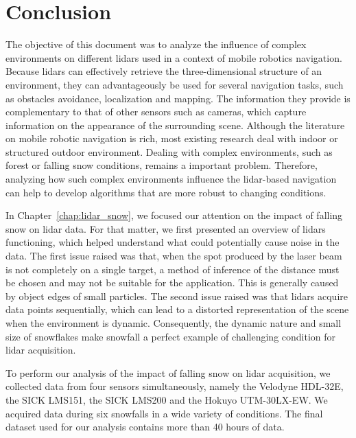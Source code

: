 \chapter*{Conclusion}

The objective of this document was to analyze the influence of complex environments on different \gls*{lidar}s used in a context of mobile robotics navigation. Because \gls*{lidar}s can effectively retrieve the three-dimensional structure of an environment, they can advantageously be used for several navigation tasks, such as obstacles avoidance, localization and mapping. The information they provide is complementary to that of other sensors such as cameras, which capture information on the appearance of the surrounding scene. Although the literature on mobile robotic navigation is rich, most existing research deal with indoor or structured outdoor environment. Dealing with complex environments, such as forest or falling snow conditions, remains a important problem. Therefore, analyzing how such complex environments influence the \gls*{lidar}-based navigation can help to develop algorithms that are more robust to changing conditions.

In Chapter~\ref{chap:lidar_snow}, we focused our attention on the impact of falling snow on \gls*{lidar} data. For that matter, we first presented an overview of \gls*{lidar}s functioning, which helped understand what could potentially cause noise in the data. The first issue raised was that, when the spot produced by the laser beam is not completely on a single target, a method of inference of the distance must be chosen and may not be suitable for the application. This is generally caused by object edges of small particles. The second issue raised was that \gls*{lidar}s acquire data points sequentially, which can lead to a distorted representation of the scene when the environment is dynamic. Consequently, the dynamic nature and small size of snowflakes make snowfall a perfect example of challenging condition for \gls*{lidar} acquisition.

To perform our analysis of the impact of falling snow on \gls*{lidar} acquisition, we collected data from four sensors simultaneously, namely the Velodyne HDL-32E, the SICK LMS151, the SICK LMS200 and the Hokuyo UTM-30LX-EW. We acquired data during six snowfalls in a wide variety of conditions. The final dataset used for our analysis contains more than 40 hours of data. 

